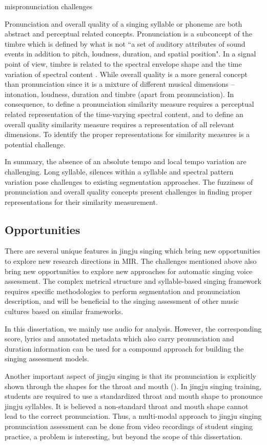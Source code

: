 mispronunciation challenges

Pronunciation and overall quality of a singing syllable or phoneme are both abstract and perceptual related concepts. Pronunciation is a subconcept of the timbre which is defined by what is not ``a set of auditory attributes of sound events in addition to pitch, loudness, duration, and spatial position". In a signal point of view, timbre is related to the spectral envelope shape and the time variation of spectral content \cite{Pons2017Timbre}. While overall quality is a more general concept than pronunciation since it is a mixture of different musical dimensions -- intonation, loudness, duration and timbre (apart from pronunciation). In consequence, to define a pronunciation similarity measure requires a perceptual related representation of the time-varying spectral content, and to define an overall quality similarity measure requires a representation of all relevant dimensions. To identify the proper representations for similarity measures is a potential challenge.

In summary, the absence of an absolute tempo and local tempo variation are challenging. Long syllable, silences within a syllable and spectral pattern variation pose challenges to existing segmentation approaches. The fuzziness of pronunciation and overall quality concepts present challenges in finding proper representations for their similarity measurement.

\subsection{Opportunities}

There are several unique features in jingju singing which bring new opportunities to explore new research directions in MIR. The challenges mentioned above also bring new opportunities to explore new approaches for automatic singing voice assessment. The complex metrical structure and syllable-based singing framework requires specific methodologies to perform segmentation and pronunciation description, and will be beneficial to the singing assessment of other music cultures based on similar frameworks.

In this dissertation, we mainly use audio for analysis. However, the corresponding score, lyrics and annotated metadata which also carry pronunciation and duration information can be used for a compound approach for building the singing assessment models.

Another important aspect of jingju singing is that its pronunciation is explicitly shown through the shapes for the throat and mouth (). In jingju singing training, students are required to use a standardized throat and mouth shape to pronounce jingju syllables. It is believed a non-standard throat and mouth shape cannot lead to the correct pronunciation. Thus, a multi-modal approach to jingju singing pronunciation assessment can be done from video recordings of student singing practice, a problem is interesting, but beyond the scope of this dissertation.

